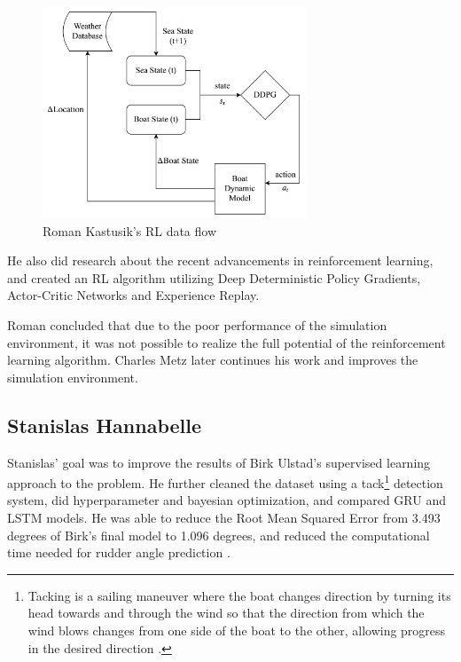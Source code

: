 \documentclass[12pt,twoside]{report}
\begin{document}
\begin{figure}[h]
\centering
\includegraphics[width = 0.7\textwidth]{figures/roman data flow.png}
\caption{Roman Kastusik's RL data flow}
\label{fig:roman dataflow}
\end{figure}

He also did research about the recent advancements in reinforcement learning, and created an RL algorithm utilizing Deep Deterministic Policy Gradients, Actor-Critic Networks and Experience Replay.

Roman concluded that due to the poor performance of the simulation environment, it was not possible to realize the full potential of the reinforcement learning algorithm. Charles Metz later continues his work and improves the simulation environment.

\subsection{Stanislas Hannabelle} \label{sec:Stan}
Stanislas' goal was to improve the results of Birk Ulstad's supervised learning approach to the problem. He further cleaned the dataset using a tack\footnote{Tacking is a sailing maneuver where the boat changes direction by turning its head towards and through the wind so that the direction from which the wind blows changes from one side of the boat to the other, allowing progress in the desired direction \cite{wiki:tack}.} detection system, did hyperparameter and bayesian optimization, and compared GRU and LSTM models. He was able to reduce the Root Mean Squared Error from 3.493 degrees of Birk's final model to 1.096 degrees, and reduced the computational time needed for rudder angle prediction \cite{stan}.
\end{document}
